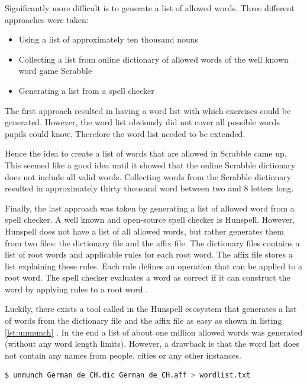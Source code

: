 Significantly more difficult is to generate a list of allowed words. Three different approaches were taken:

\begin{itemize}
  \item Using a list of approximately ten thousand nouns
  \item Collecting a list from online dictionary of allowed words of the well known word game Scrabble \cite{Scrabble}
  \item Generating a list from a spell checker
\end{itemize}

The first approach resulted in having a word list with which exercises could be generated. However, the word list obviously did not cover all possible words pupils could know. Therefore the word list needed to be extended.

Hence the idea to create a list of words that are allowed in Scrabble came up. This seemed like a good idea until it showed that the online Scrabble dictionary does not include all valid words.
Collecting words from the Scrabble dictionary resulted in approximately thirty thousand word between two and 8 letters long.

Finally, the last approach was taken by generating a list of allowed word from a spell checker. A well known and open-source spell checker is Hunspell. However, Hunspell does not have a list of all allowed words, but rather generates them from two files: the dictionary file and the affix file. The dictionary files contains a list of root words and applicable rules for each root word. The affix file stores a list explaining these rules. Each rule defines an operation that can be applied to a root word. The spell checker evaluates a word as correct if it can construct the word by applying rules to a root word \cite{Hunspell}.

Luckily, there exists a tool called  in the Hunspell ecosystem that generates a list of words from the dictionary file and the affix file as easy as shown in listing \ref{lst:unmunch} \cite{HunspellGithub}.
In the end a list of about one million allowed words was generated (without any word length limits). However, a drawback is that the word list does not contain any names from people, cities or any other instances. 

\begin{lstlisting}[language=Bash,caption={Bash command to unmunch a dictionary file and a affix file to a list of words},label={lst:unmunch}]
$ unmunch German_de_CH.dic German_de_CH.aff > wordlist.txt
\end{lstlisting}

